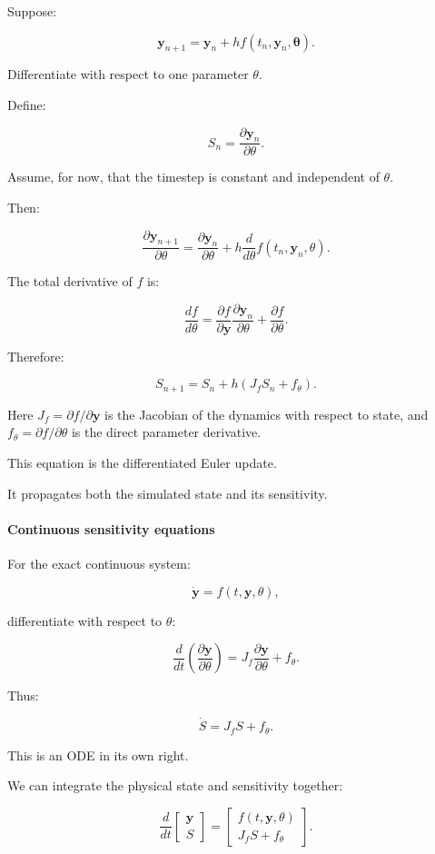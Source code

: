 Suppose:

\[
\mathbf y_{n+1} = \mathbf y_n+ h f(t_n,\mathbf y_n,\boldsymbol\theta).
\]

Differentiate with respect to one parameter \(\theta\).

Define:

\[
S_n=\frac{\partial\mathbf y_n}{\partial\theta}.
\]

Assume, for now, that the timestep is constant and independent of \(\theta\).

Then:

\[
\frac{\partial\mathbf y_{n+1}}{\partial\theta} = \frac{\partial\mathbf y_n}{\partial\theta} + h\frac{d}{d\theta} f(t_n,\mathbf y_n,\theta).
\]

The total derivative of \(f\) is:

\[
\frac{df}{d\theta} = \frac{\partial f}{\partial\mathbf y} \frac{\partial\mathbf y_n}{\partial\theta} + \frac{\partial f}{\partial\theta}.
\]

Therefore:

\[
\boxed{ S_{n+1} = S_n+ h\left(J_fS_n+f_\theta\right) }.
\]

Here \(J_f=\partial f/\partial\mathbf y\) is the Jacobian of the dynamics with respect to state, and \(f_\theta=\partial f/\partial\theta\) is the direct parameter derivative.

This equation is the differentiated Euler update.

It propagates both the simulated state and its sensitivity.

\paragraph{Continuous sensitivity equations}\label{continuous-sensitivity-equations}

For the exact continuous system:

\[
\dot{\mathbf y}=f(t,\mathbf y,\theta),
\]

differentiate with respect to \(\theta\):

\[
\frac{d}{dt} \left( \frac{\partial\mathbf y}{\partial\theta} \right) = J_f \frac{\partial\mathbf y}{\partial\theta} + f_\theta.
\]

Thus:

\[
\boxed{ \dot S=J_fS+f_\theta }.
\]

This is an ODE in its own right.

We can integrate the physical state and sensitivity together:

\[
\frac d{dt} \begin{bmatrix} \mathbf y\\S \end{bmatrix} = \begin{bmatrix} f(t,\mathbf y,\theta)\\ J_fS+f_\theta \end{bmatrix}.
\]

